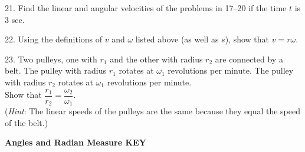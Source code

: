 \documentclass[11pt]{article}
\begin{document}
21. Find the linear and angular velocities of the problems in 17--20 if the time $t$ is 3 sec. 
\vspace{2.5in}



22. Using the definitions of $v$ and $\omega$ listed above (as well as $s$), show that $v = r\omega$.
\vspace{2in}


23. Two pulleys, one with $r_1$ and the other with radius $r_2$ are connected by a belt. The pulley with radius $r_1$ rotates at $\omega_1$ revolutions per minute. The pulley with radius $r_2$ rotates at $\omega_1$ revolutions per minute.
\newline\\

Show that $\dfrac{r_1}{r_2} = \dfrac{\omega_2}{\omega_1}$.
\newline\\

(\textit{Hint}: The linear speeds of the pulleys are the same because they equal the speed of the belt.)


\newpage


\textbf{Angles and Radian Measure KEY}
\end{document}
